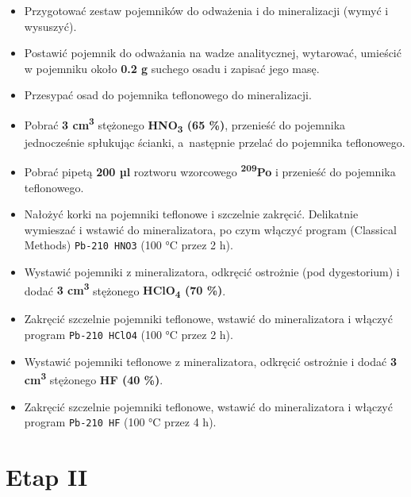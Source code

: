 \documentclass[
  letterpaper,
  DIV=11,
  numbers=noendperiod]{scrreprt}
\begin{document}
\begin{itemize}
\item
  Przygotować zestaw pojemników do odważenia i do mineralizacji (wymyć i
  wysuszyć).
\item
  Postawić pojemnik do odważania na wadze analitycznej, wytarować,
  umieścić w pojemniku około \textbf{0.2 g} suchego osadu i zapisać jego
  masę.
\item
  Przesypać osad do pojemnika teflonowego do mineralizacji.
\item
  Pobrać \textbf{3 cm\textsuperscript{3}} stężonego
  \textbf{HNO\textsubscript{3} (65 \%)}, przenieść do pojemnika
  jednocześnie spłukując ścianki, a~następnie przelać do pojemnika
  teflonowego.
\item
  Pobrać pipetą \textbf{200 µl} roztworu wzorcowego
  \textsuperscript{\textbf{209}}\textbf{Po} i przenieść do pojemnika
  teflonowego.
\item
  Nałożyć korki na pojemniki teflonowe i szczelnie zakręcić. Delikatnie
  wymieszać i wstawić do mineralizatora, po czym włączyć program
  (Classical Methods) \texttt{Pb-210\ HNO3} (100 °C przez 2 h).
\item
  Wystawić pojemniki z mineralizatora, odkręcić ostrożnie (pod
  dygestorium) i dodać \textbf{3 cm\textsuperscript{3}} stężonego
  \textbf{HClO\textsubscript{4} (70 \%)}.
\item
  Zakręcić szczelnie pojemniki teflonowe, wstawić do mineralizatora i
  włączyć program \texttt{Pb-210\ HClO4} (100 °C przez 2 h).
\item
  Wystawić pojemniki teflonowe z mineralizatora, odkręcić ostrożnie i
  dodać \textbf{3 cm\textsuperscript{3}} stężonego \textbf{HF (40 \%)}.
\item
  Zakręcić szczelnie pojemniki teflonowe, wstawić do mineralizatora i
  włączyć program \texttt{Pb-210\ HF} (100 °C przez 4 h).
\end{itemize}

\hypertarget{etap-ii}{%
\section{Etap II}\label{etap-ii}}
\end{document}
